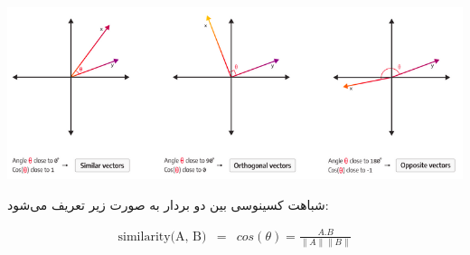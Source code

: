 \begin{enumerate}
\begin{qsolve}
		\begin{center}
			\includegraphics*[width=1\linewidth]{pics/img21.png}
			\label{معیار شباهت کسینوسی}
		\end{center}
		
	شباهت کسینوسی بین دو بردار به صورت زیر تعریف می‌شود:
	
	\begin{eqnarray*}		
		\text{similarity(A, B)}&=&cos(\theta)=\frac{A.B}{\lVert A \rVert \lVert B \rVert}
	\end{eqnarray*}
		
	\end{qsolve}
	
	
\end{enumerate}


